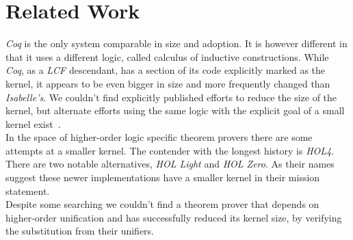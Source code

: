 \chapter{Related Work}\label{chapter:related}

\textit{Coq} is the only system comparable in size and adoption. It is however different in that it uses a different logic, called calculus of inductive constructions. While \textit{Coq}, as a \textit{LCF} descendant, has a section of its code explicitly marked as the kernel, it appears to be even bigger in size and more frequently changed than \textit{Isabelle's}. We couldn't find explicitly published efforts to reduce the size of the kernel, but alternate efforts using the same logic with the explicit goal of a small kernel exist~\parencite{Asperti2009}.\\
In the space of higher-order logic specific theorem provers there are some attempts at a smaller kernel. The contender with the longest history is \textit{HOL4}. There are two notable alternatives, \textit{HOL Light} and \textit{HOL Zero}. As their names suggest these newer implementations have a smaller kernel in their mission statement.\\
Despite some searching we couldn't find a theorem prover that depends on higher-order unification and has successfully reduced its kernel size, by verifying the substitution from their unifiers.